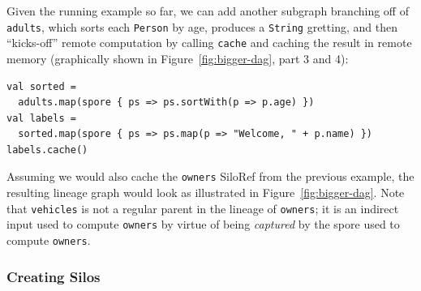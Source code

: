 \documentclass[preprint]{sigplanconf}
\theoremstyle{definition}
\theoremstyle{definition}
\begin{document}
Given the running example so far, we can add another subgraph branching off of
\verb|adults|, which sorts each \verb|Person| by age, produces a \verb|String|
gretting, and then ``kicks-off'' remote computation by calling \verb|cache| and
caching the result in remote memory (graphically shown in
Figure~\ref{fig:bigger-dag}, part 3 and 4):

\begin{lstlisting}
val sorted =
  adults.map(spore { ps => ps.sortWith(p => p.age) })
val labels =
  sorted.map(spore { ps => ps.map(p => "Welcome, " + p.name) })
labels.cache()
\end{lstlisting}
\noindent
Assuming we would also cache the \verb|owners| SiloRef from the previous
example, the resulting lineage graph would look as illustrated in
Figure~\ref{fig:bigger-dag}. Note that \verb|vehicles|
is not a regular parent in the lineage of \verb|owners|; it is an indirect
input used to compute \verb|owners| by virtue of being {\em captured} by the
spore used to compute \verb|owners|.




%

\subsubsection{Creating Silos}
\label{sec:creating-silos}
\end{document}
